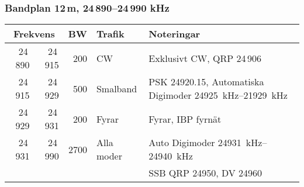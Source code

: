 \subsubsection{Bandplan 12\,m, 24\,890--24\,990 kHz}
\begin{tabular}{rrrll}
\multicolumn{2}{c}{\textbf{Frekvens}} & \textbf{BW} & \textbf{Trafik} & \textbf{Noteringar} \\ \hline

24\,890 & 24\,915 & 200  & CW         & Exklusivt CW, QRP 24\,906                           \\ \hline
24\,915 & 24\,929 & 500  & Smalband   & PSK \SI{24920,15}{}, Automatiska
                                        Digimoder \SIrange{24925}{21929}{kHz} \\ \hline
24\,929 & 24\,931 & 200  & Fyrar      & Fyrar, IBP fyrnät                                   \\ \hline
24\,931 & 24\,990 & 2700 & Alla moder & Auto Digimoder \SIrange{24931}{24940}{kHz}                         \\
        &         &      &            & SSB QRP \SI{24950}{}, DV \SI{24960}{}                          \\ \hline
\end{tabular}

